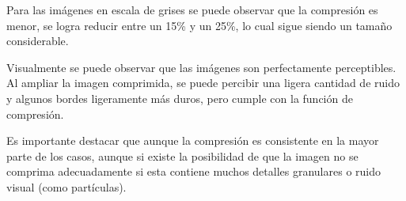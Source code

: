 Para las imágenes en escala de grises se puede observar que la compresión es menor, se logra reducir entre un 15\% y un 25\%, lo cual sigue siendo un tamaño considerable.

Visualmente se puede observar que las imágenes son perfectamente perceptibles. Al ampliar la imagen comprimida, se puede percibir una ligera cantidad de ruido y algunos bordes ligeramente más duros, pero cumple con la función de compresión.

Es importante destacar que aunque la compresión es consistente en la mayor parte de los casos, aunque si existe la posibilidad de que la imagen no se comprima adecuadamente si esta contiene muchos detalles granulares o ruido visual (como partículas).